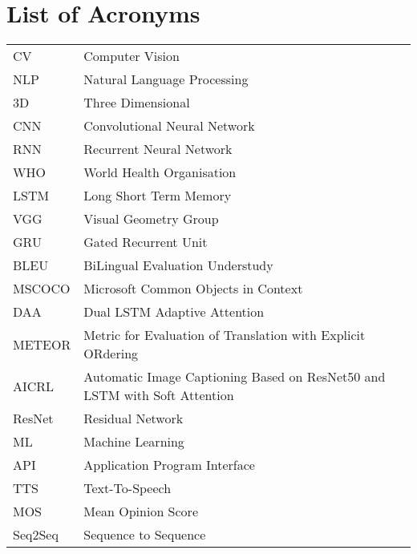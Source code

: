 \chapter*{List of Acronyms}



\begin{longtable}{ll}


CV             & Computer Vision  \\
NLP            & Natural Language Processing \\
3D             & Three Dimensional \\
CNN            & Convolutional Neural Network \\
RNN            & Recurrent Neural Network \\
WHO            & World Health Organisation \\
LSTM           & Long Short Term Memory \\
VGG            & Visual Geometry Group \\
GRU            & Gated Recurrent Unit \\
BLEU           & BiLingual Evaluation Understudy \\
MSCOCO         & Microsoft Common Objects in Context \\
DAA            & Dual LSTM Adaptive Attention \\
METEOR         & Metric for Evaluation of Translation with Explicit ORdering \\
AICRL          & Automatic Image Captioning Based on ResNet50 and LSTM with
Soft Attention \\
ResNet         & Residual Network \\
ML             & Machine Learning \\
API            & Application Program Interface \\
TTS            & Text-To-Speech \\
MOS            & Mean Opinion Score \\
Seq2Seq        & Sequence to Sequence \\









     











\end{longtable}
